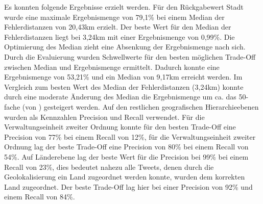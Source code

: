	Es konnten folgende Ergebnisse erzielt werden. 
	Für den Rückgabewert Stadt wurde eine maximale Ergebnismenge von 79,1\% bei einem Median der Fehlerdistanzen von 20,43km erzielt.
	Der beste Wert für den Median der Fehlerdistanzen liegt bei 3,24km mit einer Ergebnismenge von 0,99\%.
	Die Optimierung des Median zieht eine Absenkung der Ergebnismenge nach sich. 
	Durch die Evaluierung wurden Schwellwerte für den besten möglichen Trade-Off zwischen Median und Ergebnismenge ermittelt.
	Dadurch konnte eine Ergebnismenge von 53,21\% und ein Median von 9,17km erreicht werden. 
	Im Vergleich zum besten Wert des Median der Fehlerdistanzen (3,24km) konnte durch eine moderate Änderung des Median die Ergebnismenge um ca. das 50-fache (von ) gesteigert werden.
	Auf den restlichen geografischen Hierarchieebenen wurden als Kennzahlen Precision und Recall verwendet.
	Für die Verwaltungseinheit zweiter Ordnung konnte für den besten Trade-Off eine Precision von 77\% bei einem Recall von 12\%, für die Verwaltungseinheit zweiter Ordnung lag der beste Trade-Off eine Precision von 80\% bei einem Recall von 54\%.
	Auf Länderebene lag der beste Wert für die Precision bei 99\% bei einem Recall von 23\%, dies bedeutet nahezu alle Tweets, denen durch die Geolokalisierung ein Land zugeordnet werden konnte, wurden dem korrekten Land zugeordnet.
	Der beste Trade-Off lag hier bei einer Precision von 92\% und einem Recall von 84\%.



